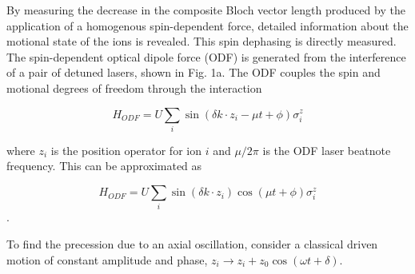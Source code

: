 \documentclass[aps,prl,preprint,groupedaddress]{revtex4-1}
\begin{document}
\begin{figure}
\centering
  \hfill
  \caption{}\label{fig:1}
\end{figure}

By measuring the decrease in the composite Bloch vector length produced by the application of a homogenous spin-dependent force, detailed information about the motional state of the ions is revealed. This spin dephasing  is directly measured. The spin-dependent optical dipole force (ODF) is generated from the interference of a pair of detuned lasers, shown in Fig. 1a. The ODF couples the spin and motional degrees of freedom through the interaction 

\begin{equation}
H_{ODF} = U\sum_{i}\sin(\delta k \cdot z_i - \mu t + \phi)\sigma^{z}_i
\end{equation}

where $z_i$ is the position operator for ion $i$ and $\mu/2\pi$ is the ODF laser beatnote frequency. This can be approximated as

\[H_{ODF} = U\sum_{i}\sin(\delta k \cdot z_i)\cos(\mu t + \phi)\sigma^{z}_i \].

To find the precession due to an axial oscillation, consider a classical driven motion of constant amplitude and phase, $z_i \rightarrow z_i +z_0\cos(\omega t+\delta)$.
\end{document}
